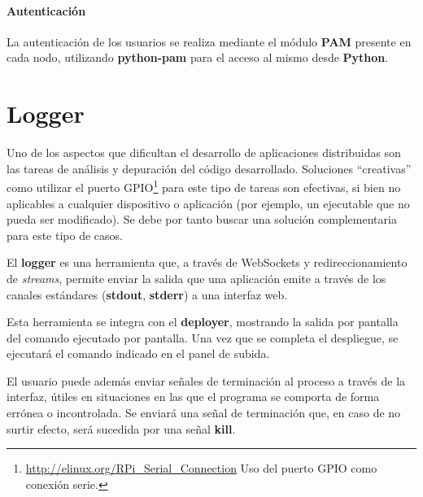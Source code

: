 \paragraph{Autenticación}

La autenticación de los usuarios se realiza mediante el módulo \textbf{PAM} presente en cada nodo\cite{osf:rfc86}, utilizando \textbf{python-pam} para el acceso al mismo desde \textbf{Python}\cite{python-am}.


\section{Logger}

Uno de los aspectos que dificultan el desarrollo de aplicaciones distribuidas son las tareas de análisis y depuración del código desarrollado. Soluciones ``creativas'' como utilizar el puerto GPIO\footnote{\href{http://elinux.org/RPi\_Serial\_Connection}{http://elinux.org/RPi\_Serial\_Connection} Uso del puerto GPIO como conexión serie.} para este tipo de tareas son efectivas, si bien no aplicables a cualquier dispositivo o aplicación (por ejemplo, un ejecutable que no pueda ser modificado). Se debe por tanto buscar una solución complementaria para este tipo de casos.

El \textbf{logger} es una herramienta que, a través de WebSockets y redireccionamiento de \textit{streams}, permite enviar la salida que una aplicación emite a través de los canales estándares (\textbf{stdout}, \textbf{stderr}) a una interfaz web.

Esta herramienta se integra con el \textbf{deployer}, mostrando la salida por pantalla del comando ejecutado por pantalla. Una vez que se completa el despliegue, se ejecutará el comando indicado en el panel de subida.

El usuario puede además enviar señales de terminación al proceso a través de la interfaz, útiles en situaciones en las que el programa se comporta de forma errónea o incontrolada. Se enviará una señal de terminación que, en caso de no surtir efecto, será sucedida por una señal \textbf{kill}. 

